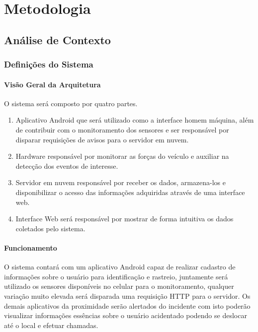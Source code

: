 \chapter{Metodologia} \label{cap:metodologia}


\section{Análise de Contexto}

\subsection{Definições do Sistema}

\subsubsection{Visão Geral da Arquitetura}



O sistema será composto por quatro partes.

\begin{enumerate}
	\item Aplicativo Android que será utilizado como a interface homem máquina, além de contribuir com o monitoramento dos sensores e ser responsável por disparar requisições de avisos para o servidor em nuvem.
	\item Hardware responsável por monitorar as forças do veículo e auxiliar na detecção dos eventos de interesse.
	\item Servidor em nuvem responsável por receber os dados, armazena-los e disponibilizar o acesso das informações adquiridas através de uma interface web.
	\item Interface Web será responsável por mostrar de forma intuitiva os dados coletados pelo sistema.
\end{enumerate}


\subsubsection{Funcionamento}

O sistema contará com um aplicativo Android capaz de realizar cadastro de informações sobre o usuário para identificação e rastreio, juntamente será utilizado os sensores disponíveis no celular para o monitoramento, qualquer variação muito elevada será disparada uma requisição HTTP para o servidor. Os demais aplicativos da proximidade serão alertados do incidente com isto poderão visualizar informações essências sobre o usuário acidentado podendo se deslocar até o local e efetuar chamadas.

